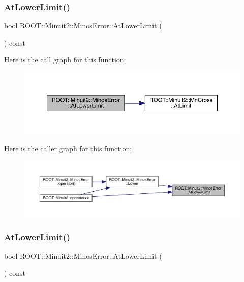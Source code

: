 \subsubsection{\texorpdfstring{AtLowerLimit()}{AtLowerLimit()}\hspace{0.1cm}{\footnotesize\ttfamily [1/3]}}
{\footnotesize\ttfamily bool R\+O\+O\+T\+::\+Minuit2\+::\+Minos\+Error\+::\+At\+Lower\+Limit (\begin{DoxyParamCaption}{ }\end{DoxyParamCaption}) const\hspace{0.3cm}{\ttfamily [inline]}}

Here is the call graph for this function\+:
\nopagebreak
\begin{figure}[H]
\begin{center}
\leavevmode
\includegraphics[width=350pt]{d2/dd1/classROOT_1_1Minuit2_1_1MinosError_ab5bac1c70b34e42714730cad95978b51_cgraph}
\end{center}
\end{figure}
Here is the caller graph for this function\+:
\nopagebreak
\begin{figure}[H]
\begin{center}
\leavevmode
\includegraphics[width=350pt]{d2/dd1/classROOT_1_1Minuit2_1_1MinosError_ab5bac1c70b34e42714730cad95978b51_icgraph}
\end{center}
\end{figure}
\mbox{\label{classROOT_1_1Minuit2_1_1MinosError_ab5bac1c70b34e42714730cad95978b51}} 
\subsubsection{\texorpdfstring{AtLowerLimit()}{AtLowerLimit()}\hspace{0.1cm}{\footnotesize\ttfamily [2/3]}}
{\footnotesize\ttfamily bool R\+O\+O\+T\+::\+Minuit2\+::\+Minos\+Error\+::\+At\+Lower\+Limit (\begin{DoxyParamCaption}{ }\end{DoxyParamCaption}) const\hspace{0.3cm}{\ttfamily [inline]}}

